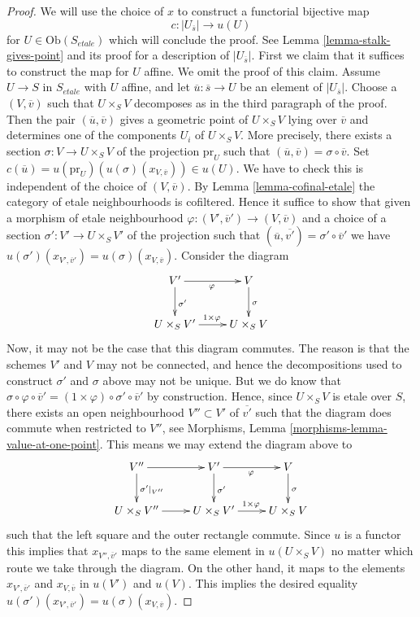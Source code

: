 \begin{proof}
\medskip\noindent
We will use the choice of $x$ to construct a functorial bijective map
$$
c : |U_{\overline{s}}| \longrightarrow u(U)
$$
for $U \in \text{Ob}(S_{etale})$ which will conclude the proof. See
Lemma \ref{lemma-stalk-gives-point}
and its proof for a description of $|U_{\overline{s}}|$.
First we claim that it suffices to construct the map for $U$ affine.
We omit the proof of this claim.
Assume $U \to S$ in $S_{etale}$ with $U$ affine, and let
$\overline{u} : \overline{s} \to U$ be an element of $|U_{\overline{s}}|$.
Choose a $(V, \overline{v})$ such that $U \times_S V$ decomposes
as in the third paragraph of the proof.
Then the pair $(\overline{u}, \overline{v})$ gives a geometric point of
$U \times_S V$ lying over $\overline{v}$ and determines one of the
components $U_i$ of $U \times_S V$. More precisely, there exists
a section $\sigma : V \to U \times_S V$ of the projection $\text{pr}_U$
such that $(\overline{u}, \overline{v}) = \sigma \circ \overline{v}$. Set
$c(\overline{u}) = u(\text{pr}_U)(u(\sigma)(x_{V, \overline{v}})) \in u(U)$.
We have to check this is independent of the choice of $(V, \overline{v})$. By
Lemma \ref{lemma-cofinal-etale}
the category of etale neighbourhoods is cofiltered.
Hence it suffice to show
that given a morphism of etale neighbourhood
$\varphi : (V', \overline{v}') \to (V, \overline{v})$ and a choice of a
section $\sigma' : V' \to U \times_S V'$ of the projection such that
$(\overline{u}, \overline{v'}) = \sigma' \circ \overline{v}'$
we have $u(\sigma')(x_{V', \overline{v}'}) = u(\sigma)(x_{V, \overline{v}})$.
Consider the diagram
$$
\xymatrix{
V' \ar[d]^{\sigma'} \ar[r]_\varphi & V \ar[d]^\sigma \\
U \times_S V' \ar[r]^{1 \times \varphi} &
U \times_S V
}
$$
Now, it may not be the case that this diagram commutes. The reason is
that the schemes $V'$ and $V$ may not be connected, and hence
the decompositions used to construct $\sigma'$ and $\sigma$ above may
not be unique. But we do know that
$\sigma \circ \varphi \circ \overline{v}' =
(1 \times \varphi) \circ \sigma' \circ \overline{v}'$
by construction. Hence, since $U \times_S V$ is etale over $S$,
there exists an open neighbourhood
$V'' \subset V'$ of $\overline{v'}$ such that the diagram does
commute when restricted to $V''$, see
Morphisms, Lemma \ref{morphisms-lemma-value-at-one-point}.
This means we may extend the diagram above to
$$
\xymatrix{
V'' \ar[r] \ar[d]^{\sigma'|_{V''}} &
V' \ar[d]^{\sigma'} \ar[r]_\varphi &
V \ar[d]^\sigma \\
U \times_S V'' \ar[r] &
U \times_S V' \ar[r]^{1 \times \varphi} &
U \times_S V
}
$$
such that the left square and the outer rectangle commute.
Since $u$ is a functor this implies that
$x_{V'', \overline{v}'}$ maps to the same element in
$u(U \times_S V)$ no matter which route we take through the
diagram. On the other hand, it maps to the elements
$x_{V', \overline{v}'}$ and $x_{V, \overline{v}}$ in
$u(V')$ and $u(V)$. This implies the desired equality
$u(\sigma')(x_{V', \overline{v}'}) = u(\sigma)(x_{V, \overline{v}})$.


\end{proof}
